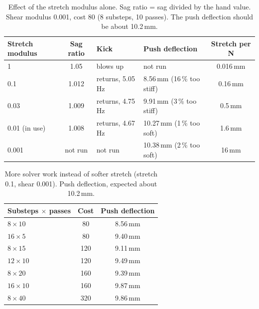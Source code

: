 \documentclass[11pt,a4paper]{article}
\begin{document}
\begin{table}[h]
  \centering
  \caption{Effect of the stretch modulus alone. Sag ratio = sag divided by the hand value. Shear modulus 0.001, cost 80 (8 substeps, 10 passes).
           The push deflection should be about 10.2\,mm.}
  \label{tab:stem-stretch}
  \begin{tabular}{lcllc}
    \toprule
    Stretch modulus & Sag ratio & Kick & Push deflection & Stretch per N \\
    \midrule
    1               & 1.05    & blows up          & not run                     & 0.016\,mm \\
    0.1             & 1.012   & returns, 5.05\,Hz & 8.56\,mm (16\,\% too stiff) & 0.16\,mm  \\
    0.03            & 1.009   & returns, 4.75\,Hz & 9.91\,mm (3\,\% too stiff)  & 0.5\,mm   \\
    0.01 (in use)   & 1.008   & returns, 4.67\,Hz & 10.27\,mm (1\,\% too soft)  & 1.6\,mm   \\
    0.001           & not run & not run           & 10.38\,mm (2\,\% too soft)  & 16\,mm    \\
    \bottomrule
  \end{tabular}
\end{table}

\begin{table}[h]
  \centering
  \caption{More solver work instead of softer stretch (stretch 0.1, shear 0.001). Push deflection,
           expected about 10.2\,mm.}
  \label{tab:stem-solver-work}
  \begin{tabular}{lcc}
    \toprule
    Substeps $\times$ passes & Cost & Push deflection \\
    \midrule
    $8 \times 10$  & 80  & 8.56\,mm \\
    $16 \times 5$  & 80  & 9.40\,mm \\
    $8 \times 15$  & 120 & 9.11\,mm \\
    $12 \times 10$ & 120 & 9.49\,mm \\
    $8 \times 20$  & 160 & 9.39\,mm \\
    $16 \times 10$ & 160 & 9.87\,mm \\
    $8 \times 40$  & 320 & 9.86\,mm \\
    \bottomrule
  \end{tabular}
\end{table}
\end{document}
